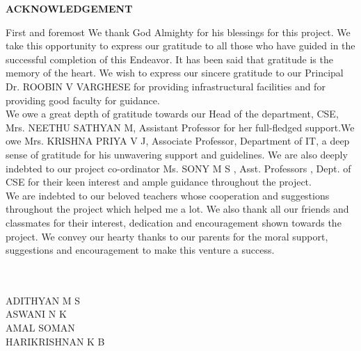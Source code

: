 	\begin{center}
		\textbf{\LARGE{ACKNOWLEDGEMENT}}\\[0.5cm]
	\end{center}
	First and foremost We thank God Almighty for his blessings for this project. We take this opportunity to express our gratitude to all those who have guided in the successful completion of this Endeavor. It has been said that gratitude is the memory of the heart. We wish to express our sincere gratitude to our Principal Dr. ROOBIN V VARGHESE for providing infrastructural facilities and for providing good faculty for guidance.\\
	
We owe a great depth of gratitude towards our Head of the department, CSE, Mrs. NEETHU SATHYAN M,  Assistant Professor for her full-fledged support.We owe Mrs. KRISHNA PRIYA V J, Associate Professor, Department of  IT, a deep sense of gratitude for his unwavering support and guidelines. We are also deeply indebted to our project co-ordinator Ms. SONY M S , Asst. Professors , Dept. of CSE for their keen interest and ample guidance throughout the project.  \\

	We are indebted to our beloved teachers whose cooperation and suggestions throughout the project which helped me a lot. We also thank all our friends and classmates for their interest, dedication and encouragement shown towards the project. We convey our hearty thanks to our parents for the moral support,  suggestions and encouragement to make this venture a success.\textbf{\\}\textbf{\\}\textbf{\\}
	\begin{FlushLeft}
	\hspace{9.5cm}
ADITHYAN M S\\\vspace{0.1cm}
\hspace{9.5cm}
ASWANI N K\\\vspace{0.1cm}
\hspace{9.5cm}
AMAL SOMAN \\ \vspace{0.1cm}
\hspace{9.5cm}
HARIKRISHNAN K B\\
	\end{FlushLeft}

	
	

